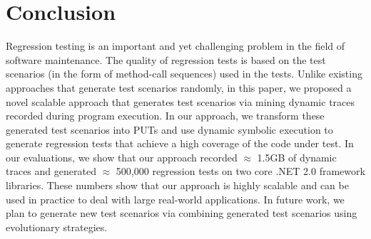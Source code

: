 \section{Conclusion}
\label{sec:conclusion}

Regression testing is an important and yet challenging problem in the
field of software maintenance. The quality of regression tests is based on
the test scenarios (in the form of method-call sequences) used in the tests.
Unlike existing approaches that generate test scenarios randomly, in this paper,
we proposed a novel scalable approach that generates test scenarios via mining dynamic
traces recorded during program execution. In our approach, we transform these generated
test scenarios into PUTs and use dynamic symbolic execution to generate regression
tests that achieve a high coverage of the code under test. In our evaluations,
we show that our approach recorded $\approx$ 1.5GB of dynamic traces and 
generated $\approx$ 500,000 regression tests on two core .NET 2.0 framework libraries. 
These numbers show that our approach is highly scalable and can be used in practice to deal 
with large real-world applications. In future work, we plan to generate new test scenarios
via combining generated test scenarios using evolutionary strategies.